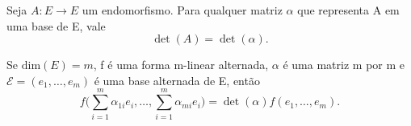 \documentclass[../differential_forms.tex]{subfiles}
\begin{document}
\begin{prop*}
  Seja \(A:E\rightarrow E\) um endomorfismo. Para qualquer matriz \(\alpha \) que representa A em uma base de E, vale 
    \[
      \det{(A)} = \det{(\alpha )}.
    \]
\end{prop*}
\begin{crl*}
  Se \(\mathrm{dim}(E)=m\), f é uma forma m-linear alternada, \(\alpha \) é uma matriz m por m e \(\mathcal{E}=(e_1,\dotsc , e_{m})\) é uma base alternada de E, então 
    \[
      f\biggl(\sum\limits_{i=1}^{m}\alpha_{1i}e_{i}, \dotsc , \sum\limits_{i=1}^{m}\alpha_{mi}e_{i}\biggr) = \det{(\alpha )}f(e_1,\dotsc , e_{m}).
    \]
\end{crl*}
\end{document}
